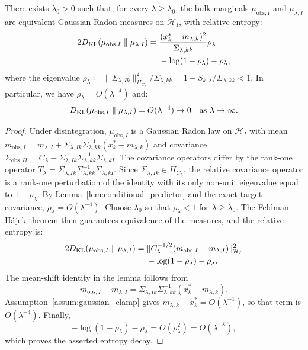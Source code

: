 \begin{lemma}
\label{lem:feldman_hajek}
There exists $\lambda_0>0$ such that, for every $\lambda\ge\lambda_0$, the bulk marginals $\mu_{\mathrm{obs},I}$ and $\mu_{\lambda,I}$ are equivalent Gaussian Radon measures on $\mathcal{H}_I$, with relative entropy:
\begin{equation}
  \begin{aligned}
  2 D_{\operatorname{KL}}(\mu_{\mathrm{obs},I} \parallel \mu_{\lambda,I})
    ={}& \frac{(x_k^* - m_{\lambda,k})^2}{\Sigma_{\lambda,kk}} \rho_\lambda \\
       &-\log(1-\rho_\lambda)-\rho_\lambda ,
  \end{aligned}
\end{equation}
where the eigenvalue $\rho_\lambda \coloneqq \|\Sigma_{\lambda,Ik}\|_{H_{C_\lambda}}^2 / \Sigma_{\lambda,kk} = 1 - S_{k,\lambda}/\Sigma_{\lambda,kk} < 1$. In particular, we have $\rho_\lambda = O(\lambda^{-4})$ and:
\begin{equation}
  D_{\operatorname{KL}}(\mu_{\mathrm{obs},I} \parallel \mu_{\lambda,I})
  = O(\lambda^{-4}) \to 0 \quad \text{as } \lambda \to \infty.
\end{equation}
\end{lemma}
\begin{proof}
Under disintegration, $\mu_{\mathrm{obs},I}$ is a Gaussian Radon law on $\mathcal{H}_I$ with mean $m_{\mathrm{obs},I} = m_{\lambda,I} + \Sigma_{\lambda,Ik} \Sigma_{\lambda,kk}^{-1}(x_k^* - m_{\lambda,k})$ and covariance $\Sigma_{\mathrm{obs},II} = C_\lambda - \Sigma_{\lambda,Ik}\Sigma_{\lambda,kk}^{-1}\Sigma_{\lambda,kI}$. The covariance operators differ by the rank-one operator $T_\lambda = \Sigma_{\lambda,Ik}\Sigma_{\lambda,kk}^{-1}\Sigma_{\lambda,kI}$.
Since $\Sigma_{\lambda,Ik} \in H_{C_\lambda}$, the relative covariance operator is a rank-one perturbation of the identity with its only non-unit eigenvalue equal to $1-\rho_\lambda$. By Lemma~\ref{lem:conditional_predictor} and the exact target covariance, $\rho_\lambda=O(\lambda^{-4})$. Choose $\lambda_0$ so that $\rho_\lambda<1$ for $\lambda\ge\lambda_0$. The Feldman--H\'ajek theorem \cite{feldman1958equivalence,bogachev1998gaussian} then guarantees equivalence of the measures, and the relative entropy is:
\begin{align*}
  2 D_{\operatorname{KL}}(\mu_{\mathrm{obs},I} \parallel \mu_{\lambda,I})
  ={}&\|C_\lambda^{-1/2}(m_{\mathrm{obs},I}-m_{\lambda,I})\|_{\mathcal{H}_I}^2 \\
  &-\log(1-\rho_\lambda)-\rho_\lambda .
\end{align*}
The mean-shift identity in the lemma follows from
\[
  m_{\mathrm{obs},I}-m_{\lambda,I}
  =\Sigma_{\lambda,Ik}\Sigma_{\lambda,kk}^{-1}
   (x_k^*-m_{\lambda,k}).
\]
Assumption~\ref{assum:gaussian_clamp} gives
$m_{\lambda,k}-x_k^*=O(\lambda^{-1})$, so that term is
$O(\lambda^{-4})$. Finally,
\[
  -\log(1-\rho_\lambda)-\rho_\lambda
  =O(\rho_\lambda^2)=O(\lambda^{-8}),
\]
which proves the asserted entropy decay.
\end{proof}

